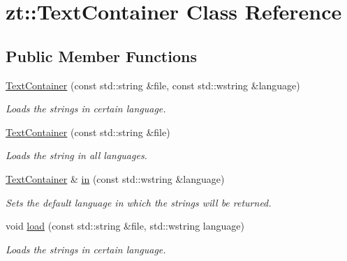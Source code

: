 \hypertarget{classzt_1_1_text_container}{}\section{zt\+:\+:Text\+Container Class Reference}
\label{classzt_1_1_text_container}
\subsection*{Public Member Functions}
\begin{DoxyCompactItemize}
\item 
\hyperlink{classzt_1_1_text_container_a0c5dfc54f704d1f89f68c12408b9e40d}{Text\+Container} (const std\+::string \&file, const std\+::wstring \&language)
\begin{DoxyCompactList}\small\item\em Loads the strings in certain language. \end{DoxyCompactList}\item 
\mbox{\label{classzt_1_1_text_container_af10b41c950585f3ab4db7d4d252d6f2f}} 
\hyperlink{classzt_1_1_text_container_af10b41c950585f3ab4db7d4d252d6f2f}{Text\+Container} (const std\+::string \&file)
\begin{DoxyCompactList}\small\item\em Loads the string in all languages. \end{DoxyCompactList}\item 
\hyperlink{classzt_1_1_text_container}{Text\+Container} \& \hyperlink{classzt_1_1_text_container_afbf2984d70eb9e421aa65b453c1d5404}{in} (const std\+::wstring \&language)
\begin{DoxyCompactList}\small\item\em Sets the default language in which the strings will be returned. \end{DoxyCompactList}\item 
void \hyperlink{classzt_1_1_text_container_a5d210555a6b099e8ddc63c03179ac41a}{load} (const std\+::string \&file, std\+::wstring language)
\begin{DoxyCompactList}\small\item\em Loads the strings in certain language. \end{DoxyCompactList}\item 
\mbox{\label{classzt_1_1_text_container_abb1a77f13098b6593e5edf2d63ed5f3f}} 

\end{DoxyCompactItemize}
